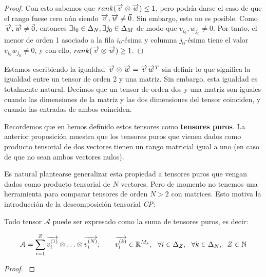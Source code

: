 \begin{proof}
Con esto sabemos que $rank(\overrightarrow{v} \otimes \overrightarrow{w}) \leq 1$, pero podría darse el caso de que el rango fuese cero aún siendo $\overrightarrow{v}, \overrightarrow{w} \neq \vec{0}$. Sin embargo, esto no es posible. Como $\overrightarrow{v}, \overrightarrow{w} \neq \vec{0}$, entonces $\exists i_0 \in \Delta_{N}, \exists j_0 \in \Delta_{M}$ de modo que $v_{i_0}, w_{j_0} \neq 0$. Por tanto, el menor de orden 1 asociado a la fila $i_0$-ésima y columna $j_0$-ésima tiene el valor $v_{i_0} w_{j_0} \neq 0$, y con ello, $rank(\overrightarrow{v} \otimes \overrightarrow{w}) \geq 1$.

\end{proof}

\begin{observacion}
    Estamos escribiendo la igualdad $\overrightarrow{v} \otimes \overrightarrow{w} = \overrightarrow{v} \overrightarrow{w}^T$ sin definir lo que significa la igualdad entre un tensor de orden 2 y una matriz. Sin embargo, esta igualdad es totalmente natural. Decimos que un tensor de orden dos y una matriz son iguales cuando las dimensiones de la matriz y las dos dimensiones del tensor coinciden, y cuando las entradas de ambos coinciden.
\end{observacion}

Recordemos que en  hemos definido estos tensores como \textbf{tensores puros}. La anterior proposición muestra que los tensores puros que vienen dados como producto tensorial de dos vectores tienen un rango matricial igual a uno (en caso de que no sean ambos vectores nulos).

Es natural plantearse generalizar esta propiedad a tensores puros que vengan dados como producto tensorial de $N$ vectores. Pero de momento no tenemos una herramienta para comparar tensores de orden $N > 2$ con matrices. Esto motiva la introducción de la descomposición tensorial \textit{CP}:

\begin{proposicion}
    Todo tensor $\mathcal{A}$ puede ser expresado como la suma de tensores puros, es decir:

    \begin{equation} \label{eq:cp_decomp}
        \mathcal{A} = \sum_{i = 1}^Z \overrightarrow{v_i^{(1)}} \otimes \ldots \otimes \overrightarrow{v_i^{(N)}};
        \qquad \overrightarrow{v_i^{(k)}} \in \mathbb{R}^{M_k},
        \ \  \forall i \in \Delta_{Z},
        \ \  \forall k \in \Delta_{N},
        \ \  Z \in \mathbb{N}
    \end{equation}
\end{proposicion}

\begin{proof} \label{proof:demostracion_cp_es_universal}
\end{proof}

